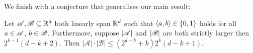\noindent We finish with a conjecture that generalises our main result:

\begin{conjecture}
    Let ${\mathscr{A}},{\mathscr{B}} \subseteq {\mathbb{R}}^d$ both linearly span ${\mathbb{R}}^d$ such that $\langle a, b\rangle \in \{0,1\}$ holds for all $a \in {\mathscr{A}}$, $b \in {\mathscr{B}}$. Furthermore, suppose $|{\mathscr{A}}|$ and $|{\mathscr{B}}|$ are both strictly larger then $2^{k-1}(d-k+2)$. Then $\left|\mathcal{A}\right| \cdot\left|\mathcal{B}\right| \leq (2^{d-k}+k)2^k(d-k+1)$.
\end{conjecture}